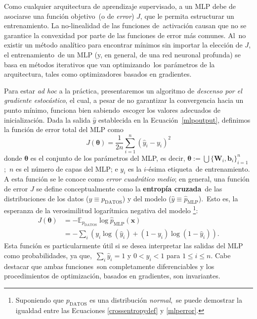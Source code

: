 \noindent
Como cualquier arquitectura de aprendizaje supervisado, a un MLP debe de asociarse una función objetivo\
(o de \emph{error}) $J$, que le permita estructurar un entrenamiento. La no-linealidad de las funciones de\
activación causan que no se garantice la convexidad por parte de las funciones de error más comunes. Al\
no existir un método analítico para encontrar mínimos sin importar la elección de $J$, el entrenamiento\
de un MLP (y, en general, de una red neuronal profunda) se basa en métodos iterativos que van optimizando\
los parámetros de la arquitectura, tales como optimizadores basados en gradientes.\par
Para estar \textit{ad hoc} a la práctica, presentaremos un algoritmo de \emph{descenso por el gradiente estocástico},
el cual, a pesar de no garantizar la convergencia hacia un punto mínimo, funciona bien sabiendo\
escoger los valores adecuados de inicialización. Dada la salida $\hat{y}$ establecida en la Ecuación\
\ref{mlpoutput}, definimos la función de error total del MLP como
\begin{equation}
  J(\bm{\theta}) = \frac{1}{2n} \sum_{i=1}^n (\hat{y}_i - y_i)^2 \label{mlperror}
\end{equation}
donde $\bm{\theta}$ es el conjunto de los parámetros del MLP, es decir, $\bm{\theta} := \bigcup\{\bm{W}_i, \bm{b}_i\}_{i=1}^n$;\
$n$ es el número de capas del MLP; e $y_i$ es la $i$-ésima etiqueta\
de entrenamiento. A esta función se le conoce como \emph{error cuadrático medio}; en general,
una función de error $J$ se define conceptualmente como la \textbf{entropía cruzada}\
de las distribuciones de los datos ($y \equiv p_{\text{DATOS}}$) y del modelo ($\hat{y} \equiv \hat{p}_{\text{MLP}}$).\
Esto es, la esperanza de la verosimilitud logarítmica negativa del modelo%
\footnote{
  Suponiendo que $p_{\text{DATOS}}$ es una distribución \emph{normal},\
  se puede demostrar la igualdad entre las Ecuaciones \ref{crossentropydef} y \ref{mlperror}.
 }:
\begin{align}
  J(\bm{\theta}) &=  - \mathbb{E}_{p_{\text{DATOS}}} \log\hat{p}_{\text{MLP}}(\bm{x}) \label{crossentropydef}\\
  &= - \sum_i (y_i\log(\hat{y}_i) + (1 - y_i)\log(1 - \hat{y}_i)). \label{crossentropy}
\end{align}
Esta función es particularmente útil si se desea interpretar las salidas del MLP como probabilidades, ya que,\
$\sum_i \hat{y}_i = 1$ y $0 < \hat{y}_i < 1 $ para $1 \leq i \leq n$. Cabe destacar que ambas funciones\
son completamente diferenciables y los procedimientos de optimización, basados en gradientes, son invariantes.

